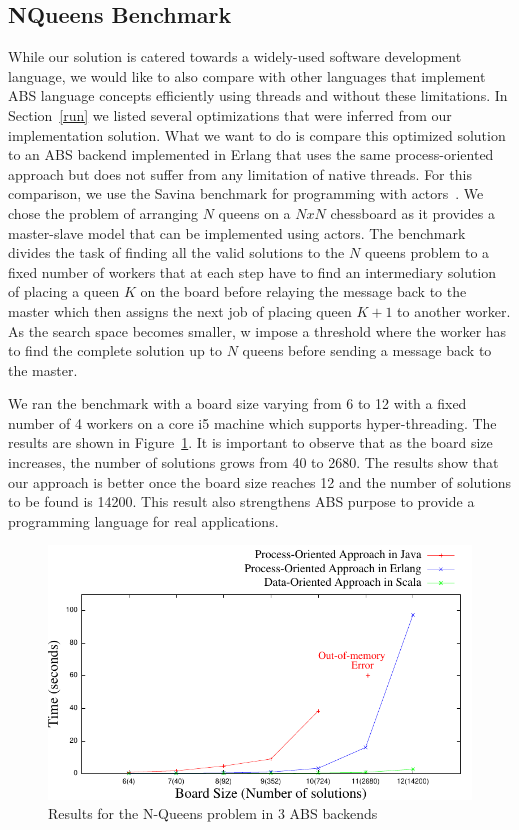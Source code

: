 \subsection{NQueens Benchmark}
\label{bench2}
\par While our solution is catered towards a widely-used software development language, we would like to also compare with other languages that implement ABS language concepts efficiently using threads and without these limitations. In Section~\ref{run} we listed several optimizations that were inferred from our implementation solution. What we want to do is compare this optimized solution to an ABS backend implemented in Erlang that uses the same process-oriented approach but does not suffer from any limitation of native threads. For this comparison, we use the Savina benchmark for programming with actors~\cite{savina}.  We chose the problem of arranging $N$ queens on a $NxN$ chessboard as it provides a master-slave model that can be implemented using actors.  The benchmark divides the task of finding all the valid solutions to the $N$ queens problem to a fixed number of workers that at each step have to find an intermediary solution of placing a queen $K$ on the board before relaying the message back to the master which then assigns the next job of placing queen $K+1$ to another worker. As the search space becomes smaller, w impose a threshold where the worker has to find the complete solution up to $N$ queens before sending a message back to the master. 
\par We ran the benchmark with a board size varying from 6 to 12 with a fixed number of 4 workers on a core i5 machine which supports hyper-threading. The results are shown in Figure~\ref{ej}. It is important to observe that as the board size increases, the number of solutions grows from 40 to 2680. The results show that our approach is better once the board size reaches 12 and the number of solutions to be found is 14200. This result also strengthens ABS purpose to provide a programming language for real applications.

\begin{figure}
	\centering
	\includegraphics[scale=.7]{erlj8.pdf}
	\caption{Results for the N-Queens problem in 3 ABS backends}
	\label{ej}
\end{figure}


